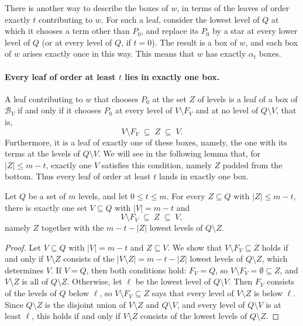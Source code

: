 There is another way to describe the boxes of $w$, in terms of the leaves of order exactly $t$ contributing to $w$. For such a leaf, consider the lowest level of $Q$ at which it chooses a term other than $P_0$, and replace its $P_0$ by a star at every lower level of $Q$ (or at every level of $Q$, if $t=0$). The result is a box of $w$, and each box of $w$ arises exactly once in this way. This means that $w$ has exactly $\alpha_t$ boxes.

\paragraph{Every leaf of order at least $t$ lies in exactly one box.}
A leaf contributing to $w$ that chooses $P_0$ at the set $Z$ of levels is a leaf of a box of $\mathcal B_V$ if and only if it chooses $P_0$ at every level of $V\setminus F_V$ and at no level of $Q\setminus V$, that is,
\[
V\setminus F_V\;\subseteq\;Z\;\subseteq\;V.
\]
Furthermore, it is a leaf of exactly one of these boxes, namely, the one with its terms at the levels of $Q\setminus V$. We will see in the following lemma that, for $|Z|\le m-t$, exactly one $V$ satisfies this condition, namely $Z$ padded from the bottom. Thus every leaf of order at least $t$ lands in exactly one box.

\begin{lemma}\label{lem:partition}
Let $Q$ be a set of $m$ levels, and let $0\le t\le m$. For every $Z\subseteq Q$ with $|Z|\le m-t$, there is exactly one set $V\subseteq Q$ with $|V|=m-t$ and
\[
V\setminus F_V\;\subseteq\;Z\;\subseteq\;V,
\]
namely $Z$ together with the $m-t-|Z|$ lowest levels of $Q\setminus Z$.
\end{lemma}

\begin{proof}
Let $V\subseteq Q$ with $|V|=m-t$ and $Z\subseteq V$. We show that $V\setminus F_V\subseteq Z$ holds if and only if $V\setminus Z$ consists of the $|V\setminus Z|=m-t-|Z|$ lowest levels of $Q\setminus Z$, which determines $V$. If $V=Q$, then both conditions hold: $F_V=Q$, so $V\setminus F_V=\emptyset\subseteq Z$, and $V\setminus Z$ is all of $Q\setminus Z$. Otherwise, let $\ell$ be the lowest level of $Q\setminus V$. Then $F_V$ consists of the levels of $Q$ below $\ell$, so $V\setminus F_V\subseteq Z$ says that every level of $V\setminus Z$ is below $\ell$. Since $Q\setminus Z$ is the disjoint union of $V\setminus Z$ and $Q\setminus V$, and every level of $Q\setminus V$ is at least $\ell$, this holds if and only if $V\setminus Z$ consists of the lowest levels of $Q\setminus Z$.
\end{proof}

